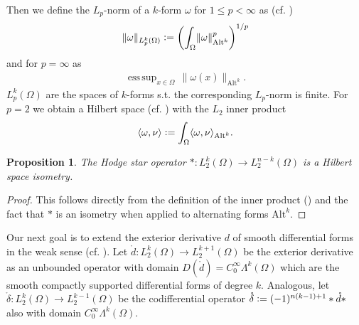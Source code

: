 \documentclass[12pt,a4paper]{article}
\newtheorem{proposition}{Proposition}
\theoremstyle{definition}
\DeclareMathOperator*{\esssup}{ess\,sup}
\newcommand{\smoothcompforms}[2]{C_0^\infty \Lambda^{#1}(#2)}
\begin{document}
Then
we define the $L_p$-norm of a $k$-form $\omega$ for $1\leq p < \infty$
as (cf. \cite{goldshtein})
\begin{align*}
\lVert \omega \rVert _{L_p^k(\Omega)}\vcentcolon=
\left(\int_\Omega \lVert \omega \rVert _{\text{Alt}^k}^p \right)^{1/p}
\end{align*}
and for $p=\infty$ as
\begin{align*}
\esssup_{x\in \Omega} \, \lVert \omega(x) \rVert _{\text{Alt}^k}.
\end{align*}
$L_p^k(\Omega)$ are the spaces of $k$-forms 
s.t. the corresponding $L_p$-norm is finite.
For $p=2$ we obtain a Hilbert space (cf. \cite[Sec. 6.2.6]{arnold}) 
with the $L_2$ inner product  
\begin{align}
\langle \omega, \nu \rangle \vcentcolon= 
\int_\Omega \langle \omega, \nu \rangle _{\text{Alt}^k}. 
\label{def_inner_product}
\end{align}
\begin{proposition}
    The Hodge star operator $*:L^k_2(\Omega) \rightarrow L^{n-k}_2(\Omega)$ is a
    Hilbert space isometry.
\end{proposition}
\begin{proof}
    This follows directly from the definition of the inner product 
    () and the fact that $*$ is an isometry 
    when applied to alternating forms $\text{Alt}^k$.
\end{proof}


Our next goal is to extend the exterior derivative $d$ 
of smooth differential forms in the weak sense (cf. \cite{goldshtein}). 
Let $\mathring{d}: L^k_2(\Omega) \rightarrow L^{k+1}_2(\Omega)$ be the exterior
derivative as an unbounded operator with domain 
$D(\mathring{d}) = \smoothcompforms{k}{\Omega}$ 
which are the smooth compactly supported differential forms of degree $k$. 
Analogous, let 
$\mathring{\delta}: L^k_2(\Omega) \rightarrow L^{k-1}_2(\Omega)$ be the 
codifferential operator $\mathring{\delta} \vcentcolon= 
(-1)^{n(k-1)+1}*\mathring{d}*$ also with domain $\smoothcompforms{k}{\Omega}$.
\end{document}
